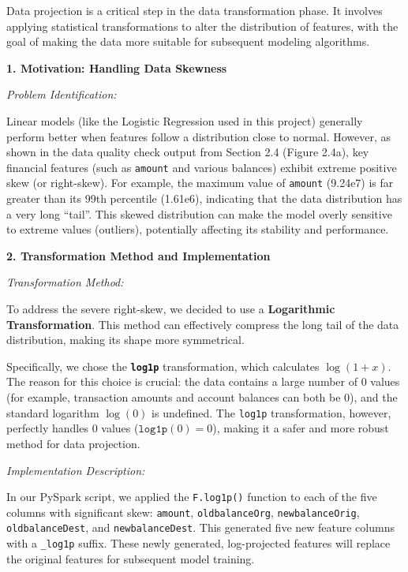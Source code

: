 \documentclass[sigplan,screen]{acmart}
\begin{document}
Data projection is a critical step in the data transformation phase. It involves applying statistical transformations to alter the distribution of features, with the goal of making the data more suitable for subsequent modeling algorithms.

\textbf{1. Motivation: Handling Data Skewness}

\textit{Problem Identification:}

Linear models (like the Logistic Regression used in this project) generally perform better when features follow a distribution close to normal. However, as shown in the data quality check output from Section 2.4 (Figure 2.4a), key financial features (such as \texttt{amount} and various balances) exhibit extreme positive skew (or right-skew). For example, the maximum value of \texttt{amount} (9.24e7) is far greater than its 99th percentile (1.61e6), indicating that the data distribution has a very long ``tail''. This skewed distribution can make the model overly sensitive to extreme values (outliers), potentially affecting its stability and performance.

\textbf{2. Transformation Method and Implementation}

\textit{Transformation Method:}

To address the severe right-skew, we decided to use a \textbf{Logarithmic Transformation}. This method can effectively compress the long tail of the data distribution, making its shape more symmetrical.

Specifically, we chose the \textbf{\texttt{log1p}} transformation, which calculates $\log(1+x)$. The reason for this choice is crucial: the data contains a large number of 0 values (for example, transaction amounts and account balances can both be 0), and the standard logarithm $\log(0)$ is undefined. The \texttt{log1p} transformation, however, perfectly handles 0 values ($\texttt{log1p}(0) = 0$), making it a safer and more robust method for data projection.

\textit{Implementation Description:}

In our PySpark script, we applied the \texttt{F.log1p()} function to each of the five columns with significant skew: \texttt{amount}, \texttt{oldbalanceOrg}, \texttt{newbalanceOrig}, \texttt{oldbalanceDest}, and\newline
\texttt{newbalanceDest}.
This generated five new feature columns with a \texttt{\_log1p} suffix. These newly generated, log-projected features will replace the original features for subsequent model training.
\end{document}
